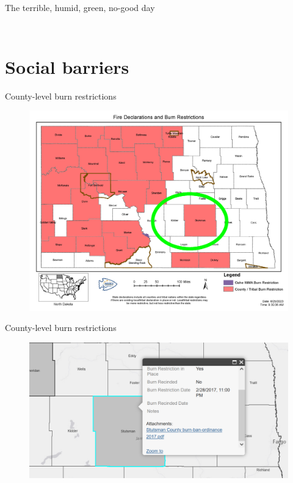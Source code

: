 \documentclass[11pt]{beamer}
\begin{document}
\begin{frame}{The terrible, humid, green, no-good day}
\begin{columns}
\begin{column}{0.4\textwidth}
\begin{center}
\begin{figure}
				\end{figure}
			\end{center}
		\end{column}
	\end{columns}
\end{frame}

\section{Social barriers}

\begin{frame}{County-level burn restrictions}
	\begin{center}
		\begin{figure}
			\includegraphics[width=1\linewidth]{figs/FireDeclarations.png} 
		\end{figure}
	\end{center}
\end{frame}

\begin{frame}{County-level burn restrictions}
	\begin{center}
		\begin{figure}
			\includegraphics[width=1\linewidth]{figs/StutsmanBurnBan} 
		\end{figure}
	\end{center}
\end{frame}
\end{document}
